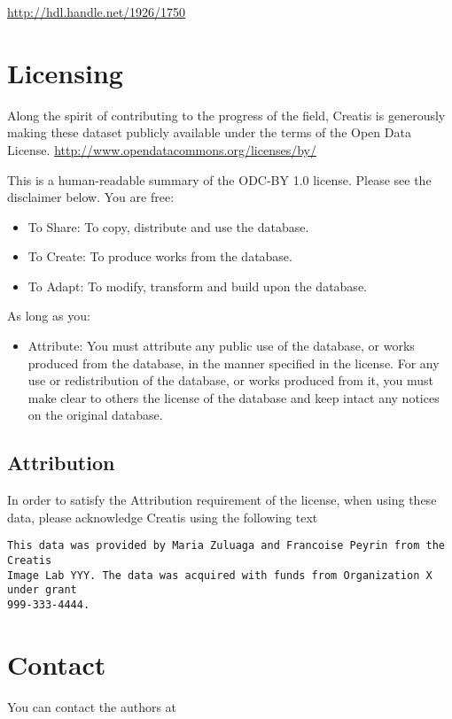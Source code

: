 \documentclass{InsightArticle}
\begin{document}
\url{http://hdl.handle.net/1926/1750}


\section{Licensing}

Along the spirit of contributing to the progress of the field, Creatis is
generously making these dataset publicly available under the terms of the Open
Data License.
\url{http://www.opendatacommons.org/licenses/by/}

This is a human-readable summary of the ODC-BY 1.0 license. Please see the disclaimer below.
You are free:\\

\begin{itemize}
\item To Share: To copy, distribute and use the database.
\item To Create: To produce works from the database.
\item To Adapt: To modify, transform and build upon the database.
\end{itemize}

As long as you:\\

\begin{itemize}
\item Attribute: You must attribute any public use of the database, or works
produced from the database, in the manner specified in the license. For any use
or redistribution of the database, or works produced from it, you must make
clear to others the license of the database and keep intact any notices on the
original database.
\end{itemize}


\subsection{Attribution}

In order to satisfy the Attribution requirement of the license, when using
these data, please acknowledge Creatis using the following text

\begin{verbatim}
This data was provided by Maria Zuluaga and Francoise Peyrin from the Creatis
Image Lab YYY. The data was acquired with funds from Organization X under grant
999-333-4444.
\end{verbatim}

\section{Contact}

You can contact the authors at


%
%



\end{document}
